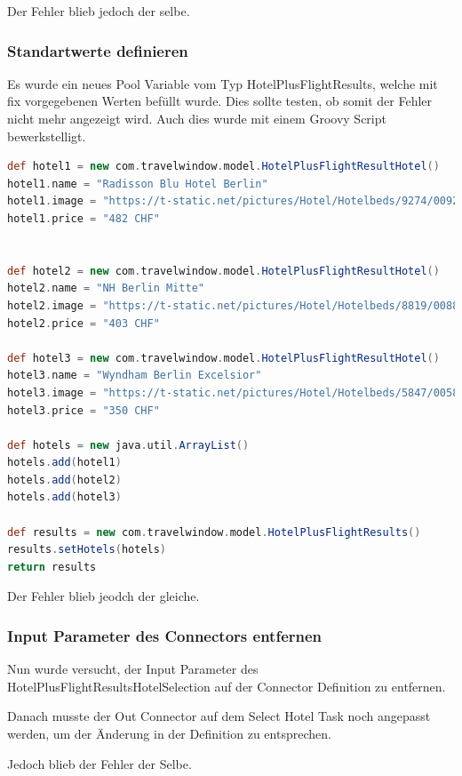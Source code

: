 Der Fehler blieb jedoch der selbe.

\subsubsection{Standartwerte definieren}
Es wurde ein neues Pool Variable vom Typ  HotelPlusFlightResults, welche mit fix vorgegebenen Werten befüllt wurde. Dies sollte testen, ob somit der Fehler nicht mehr angezeigt wird. Auch dies wurde mit einem Groovy Script bewerkstelligt.

\begin{lstlisting}[language=Groovy,firstnumber=1]
def hotel1 = new com.travelwindow.model.HotelPlusFlightResultHotel()
hotel1.name = "Radisson Blu Hotel Berlin"
hotel1.image = "https://t-static.net/pictures/Hotel/Hotelbeds/9274/009274a_hb_ba_003.jpg?width=240&height=180&scale=both&mode=crop"
hotel1.price = "482 CHF"


def hotel2 = new com.travelwindow.model.HotelPlusFlightResultHotel()
hotel2.name = "NH Berlin Mitte"
hotel2.image = "https://t-static.net/pictures/Hotel/Hotelbeds/8819/008819a_hb_ba_008.jpg?width=240&height=180&scale=both&mode=crop"
hotel2.price = "403 CHF"

def hotel3 = new com.travelwindow.model.HotelPlusFlightResultHotel()
hotel3.name = "Wyndham Berlin Excelsior"
hotel3.image = "https://t-static.net/pictures/Hotel/Hotelbeds/5847/005847a_hb_l_010.jpg?width=240&height=180&scale=both&mode=crop"
hotel3.price = "350 CHF"

def hotels = new java.util.ArrayList()
hotels.add(hotel1)
hotels.add(hotel2)
hotels.add(hotel3)

def results = new com.travelwindow.model.HotelPlusFlightResults()
results.setHotels(hotels)
return results
\end{lstlisting}

Der Fehler blieb jeodch der gleiche.

\subsubsection{Input Parameter des Connectors entfernen}
Nun wurde versucht, der Input Parameter des HotelPlusFlightResultsHotelSelection auf der Connector Definition zu entfernen.

Danach musste der Out Connector auf dem Select Hotel Task noch angepasst werden, um der Änderung in der Definition zu entsprechen.

Jedoch blieb der Fehler der Selbe.

